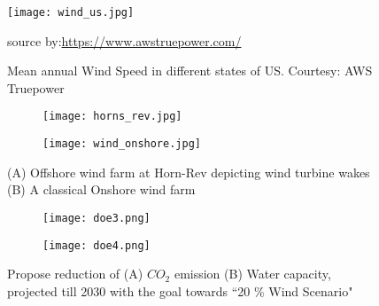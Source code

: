 \begin{figure}[h!]
\texttt{[image: wind\_us.jpg]}
\caption[Mean annual Wind Speed]{Mean annual Wind Speed in different states of US. Courtesy: AWS Truepower}
\centering
\small source by:\url{https://www.awstruepower.com/} \label{fig:resource}
\end{figure}

\begin{figure}[h!]
\centering
        \begin{subfigure}[h]{0.5175\textwidth}
                \texttt{[image: horns\_rev.jpg]}
                \caption{}
                \label{fig:figure_horns}
        \end{subfigure}%
        \centering
        \begin{subfigure}[h]{0.48675\textwidth}
                \texttt{[image: wind\_onshore.jpg]}
                \caption{}
                \label{fig:onshore}
        \end{subfigure}
       \caption[Offshore and Onshore wind farms]{(A) Offshore wind farm at Horn-Rev depicting wind turbine wakes (B) A classical Onshore wind farm}
\label{fig:smag}
\end{figure}

\begin{figure}[t!]
       \centering
        \begin{subfigure}[h]{0.5\textwidth}
                \texttt{[image: doe3.png]}
                \caption{}
                \label{fig:do3}
        \end{subfigure}%
       \begin{subfigure}[h]{0.6\textwidth}
                \texttt{[image: doe4.png]}
                \caption{}
                \label{fig:do3}
        \end{subfigure}%
       \caption[$CO_2 \ \&$ Water Reduction]{ Propose reduction of (A) $CO_2$ emission (B) Water capacity, projected till 2030 with the goal towards ``20 \% Wind Scenario"}
\label{fig:smag}
\end{figure}

